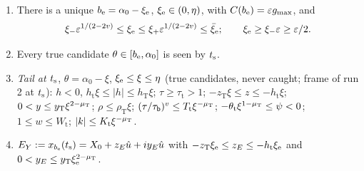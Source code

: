 \begin{lemma}\label{lem:HTp-tail}
\begin{enumerate}
\item[(a)] There is a unique $b_{\mathrm e}=\alpha_0-\xi_{\mathrm e}$, $\xi_{\mathrm e}\in(0,\eta)$, with $C(b_{\mathrm e})=\varepsilon g_{\max}$, and
\[
\xi_-\varepsilon^{1/(2-2v)}\le\xi_{\mathrm e}\le\xi_+\varepsilon^{1/(2-2v)}\le\bar\xi_{\mathrm e};\qquad\xi_{\mathrm e}\ge\xi_-\varepsilon\ge\varepsilon/2 .
\]
\item[(b)] Every true candidate $\theta\in[b_{\mathrm e},\alpha_0]$ is seen by $t_{\mathrm s}$.
\item[(c)] \emph{Tail at $t_{\mathrm s}$}, $\theta=\alpha_0-\xi$, $\xi_{\mathrm e}\le\xi\le\eta$ (true candidates, never caught; frame of run 2 at $t_{\mathrm s}$):
$h<0$, $h_{\mathrm t}\xi\le|h|\le h_{\mathrm T}\xi$; $\tau\ge\tau_{\mathrm t}>1$; $-z_{\mathrm T}\xi\le z\le-h_{\mathrm t}\xi$;
$0<y\le y_{\mathrm T}\xi^{2-\mu_{\mathrm T}}$; $\rho\le\rho_{\mathrm T}\xi$; $(\tau/\tau_{\mathsf b})^v\le T_{\mathrm t}\xi^{-\mu_{\mathrm T}}$;
$-\theta_{\mathrm t}\xi^{1-\mu_{\mathrm T}}\le\psi<0$; $1\le w\le W_{\mathrm t}$; $|k|\le K_{\mathrm t}\xi^{-\mu_{\mathrm T}}$.
\item[(d)] $E_Y:=x_{b_{\mathrm e}}(t_{\mathrm s})=X_0+z_E\hat u+iy_E\hat u$ with $-z_{\mathrm T}\xi_{\mathrm e}\le z_E\le-h_{\mathrm t}\xi_{\mathrm e}$ and
$0<y_E\le y_{\mathrm T}\xi_{\mathrm e}^{2-\mu_{\mathrm T}}$.
\end{enumerate}
\end{lemma}
